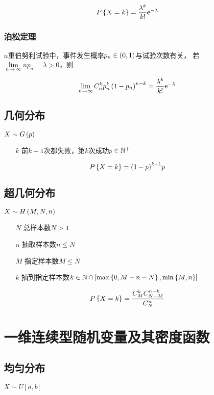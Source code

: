 \documentclass{article}
\begin{document}
\[P\left\{X=k\right\}=\frac{\lambda^k}{k!}\mathrm e^{-\lambda}\]

\subsubsection{泊松定理}

$n$重伯努利试验中，事件发生概率$p_n\in\left(0,1\right)$与试验次数有关，
若$\lim\limits_{n\to\infty}np_n=\lambda>0$，则

\[\lim_{n\to\infty}C_n^kp_n^k\left(1-p_n\right)^{n-k}
    =\dfrac{\lambda^k}{k!}\mathrm e^{-\lambda}\]

\subsection{几何分布}

$X\sim G\left(p\right)$

\begin{enumerate}
    \item [$k$] 前$k-1$次都失败，第$k$次成功$p\in\mathbb N^+$
\end{enumerate}

\[P\left\{X=k\right\}={\left(1-p\right)}^{k-1}p\]

\subsection{超几何分布}

$X\sim H\left(M,N,n\right)$

\begin{enumerate}
    \item [$N$] 总样本数$N>1$
    \item [$n$] 抽取样本数$n\leqslant N$
    \item [$M$] 指定样本数$M\leqslant N$
    \item [$k$] 抽到指定样本数$k\in\mathbb N\cap\left[\max\left\{0,M+n-N\right\},\min\left\{M,n\right\}\right]$
\end{enumerate}

\[P\left\{X=k\right\}=\frac{C_M^kC_{N-M}^{n-k}}{C_N^n}\]

\section{一维连续型随机变量及其密度函数}

\subsection{均匀分布}

$X\sim U\left[a,b\right]$
\end{document}
